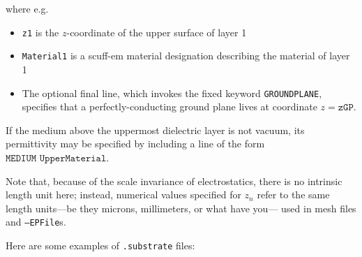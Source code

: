 \documentclass[letterpaper]{article}
\begin{document}
\medskip

where e.g.
\begin{itemize}
 \item \texttt{z1} is the $z$-coordinate of the upper surface of
       layer 1
 \item \texttt{Material1} is a {\sc scuff-em} material designation
       describing the material of layer 1
 \item The optional 
       final line, which invokes the fixed keyword \texttt{GROUNDPLANE},
       specifies that a perfectly-conducting ground plane lives at 
       coordinate $z=\texttt{zGP}$.
\end{itemize}
If the medium above the uppermost dielectric layer is not vacuum,
its permittivity may be specified by including a line of the form
$\texttt{MEDIUM UpperMaterial}.$

Note that, because of the scale invariance of electrostatics,
there is no intrinsic length unit here; instead, numerical values
specified for $z_n$ refer to the same length units---be they
microns, millimeters, or what have you--- used in mesh files 
and \texttt{--EPFile}s.

Here are some examples of \texttt{.substrate} files:
\end{document}
